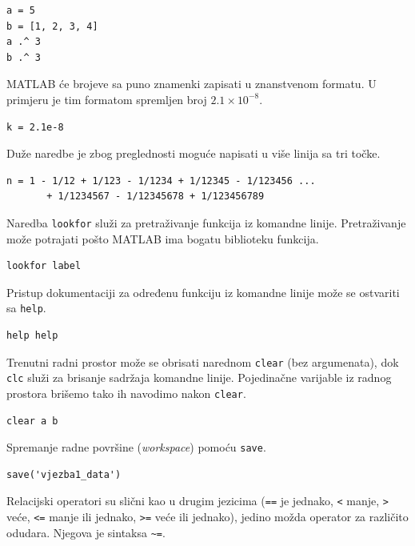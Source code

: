\documentclass[a4paper, 10pt]{article}
\begin{document}
\begin{lstlisting}
a = 5
b = [1, 2, 3, 4]
a .^ 3
b .^ 3
\end{lstlisting}

MATLAB će brojeve sa puno znamenki zapisati u znanstvenom formatu.
U primjeru je tim formatom spremljen broj $2.1 \times 10^{-8}$.

\begin{lstlisting}
k = 2.1e-8
\end{lstlisting}

Duže naredbe je zbog preglednosti moguće napisati u više linija sa tri točke.

\begin{lstlisting}
n = 1 - 1/12 + 1/123 - 1/1234 + 1/12345 - 1/123456 ...
       + 1/1234567 - 1/12345678 + 1/123456789
\end{lstlisting}

Naredba \texttt{lookfor} služi za pretraživanje funkcija iz komandne linije.
Pretraživanje može potrajati pošto MATLAB ima bogatu biblioteku funkcija.

\begin{lstlisting}
lookfor label
\end{lstlisting}

Pristup dokumentaciji za određenu funkciju iz komandne linije može se ostvariti sa \texttt{help}.

\begin{lstlisting}
help help
\end{lstlisting}

Trenutni radni prostor može se obrisati narednom \texttt{clear} (bez argumenata), dok \texttt{clc} služi za brisanje sadržaja komandne linije.
Pojedinačne varijable iz radnog prostora brišemo tako ih navodimo nakon \texttt{clear}.

\begin{lstlisting}
clear a b
\end{lstlisting}

Spremanje radne površine (\emph{workspace}) pomoću \texttt{save}.

\begin{lstlisting}
save('vjezba1_data')
\end{lstlisting}

Relacijski operatori su slični kao u drugim jezicima (\texttt{==} je jednako, \texttt{<} manje, \texttt{>} veće, \texttt{<=} manje ili jednako, \texttt{>=} veće ili jednako), jedino možda operator za različito odudara.
Njegova je sintaksa \texttt{\textasciitilde=}.
\end{document}
